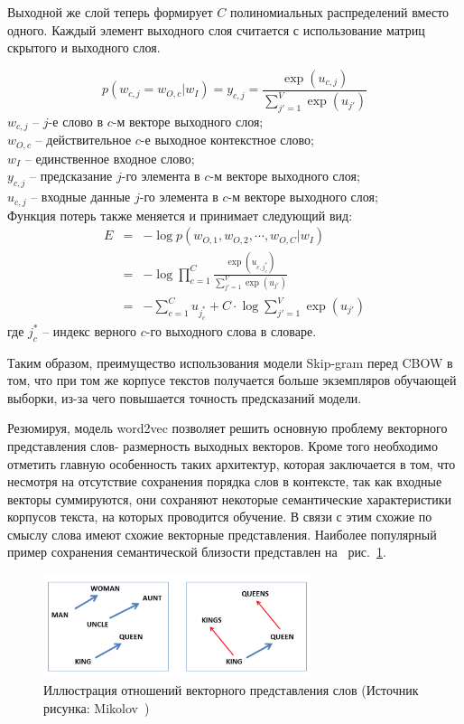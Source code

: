 Выходной же слой теперь формирует $C$ полиномиальных распределений вместо одного. Каждый элемент выходного слоя считается с использование матриц скрытого и выходного слоя.

\begin{equation}
p(w_{c,j} = w_{O,c} | w_I) = y_{c,j} = \frac{\exp(u_{c,j})}{\sum_{j'=1}^V\exp(u_{j'})}
\end{equation}
$w_{c,j}$ -- $j$-е слово в $c$-м векторе выходного слоя;\\
$w_{O,c}$  -- действительное $c$-е выходное контекстное слово; \\
$w_I$ -- единственное входное слово;\\
$y_{c,j}$ -- предсказание $j$-го элемента в $c$-м векторе выходного слоя;\\
$u_{c,j}$  -- входные данные $j$-го элемента в $c$-м векторе выходного слоя;\\


Функция потерь также меняется и принимает следующий вид:
\begin{eqnarray}
E &=& -\log p(w_{O,1}, w_{O,2}, \cdots, w_{O,C} | w_I) \\
&=& -\log \prod_{c=1}^C\frac{\exp(u_{c,j_c^*})}{\sum_{j'=1}^V\exp(u_{j'})} \\
&=& -\sum_{c=1}^C u_{j_c^*} + C\cdot\log\sum_{j'=1}^V\exp(u_{j'})
\end{eqnarray}
где  $j_c^*$ -- индекс верного $c$-го выходного слова в словаре.

Таким образом, преимущество использования модели Skip-gram перед CBOW в том, что при том же корпусе текстов получается больше экземпляров обучающей выборки, из-за чего повышается точность предсказаний модели.

Резюмируя, модель word2vec позволяет решить основную проблему векторного представления слов- размерность выходных векторов. Кроме того необходимо отметить главную особенность таких архитектур, которая заключается в том, что несмотря на отсутствие сохранения порядка слов в контексте, так как входные векторы суммируются, они сохраняют некоторые семантические характеристики корпусов текста, на которых проводится обучение. В связи с этим схожие по смыслу слова имеют схожие векторные представления. Наиболее популярный пример сохранения семантической близости представлен на ~рис.~\ref{fig:w2v-semantic}.


\begin{figure}[t]%
\centering
\includegraphics[width=0.7\textwidth]{img/w2v-semantic.png}
\caption{\label{fig:w2v-semantic}Иллюстрация отношений векторного представления слов (Источник рисунка: Mikolov~\autocite{mikolov-etal-2013-linguistic})}
\end{figure}

